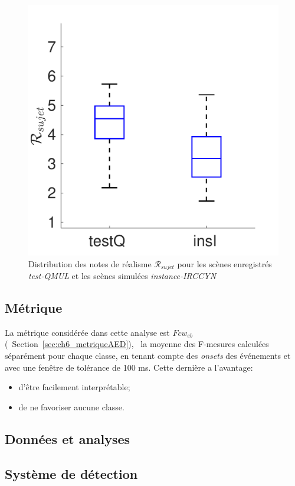 \begin{figure}[t]
\begin{center}
\includegraphics[width=.33\textwidth]{gfx/ch_7/xp_realism_2}
\caption{Distribution des notes de réalisme $\mathcal{R}_{sujet}$ pour les scènes enregistrés \emph{test-QMUL} et les scènes simulées \emph{instance-IRCCYN}}
\label{fig:xpRealism} 
\end{center}
\end{figure}

\subsection{Métrique}

La métrique considérée dans cette analyse est $Fcw_{eb}$ (\cf~Section~\ref{sec:ch6_metriqueAED}), \ie~la moyenne  des F-mesures calculées séparément pour chaque classe, en tenant compte des \emph{onsets} des événements et avec une fenêtre de tolérance de 100 ms. Cette dernière a l'avantage: 

\begin{itemize}
\item d'être  facilement interprétable;
\item de ne favoriser aucune classe.
\end{itemize}

\subsection{Données et analyses}


\subsection{Système de détection}

